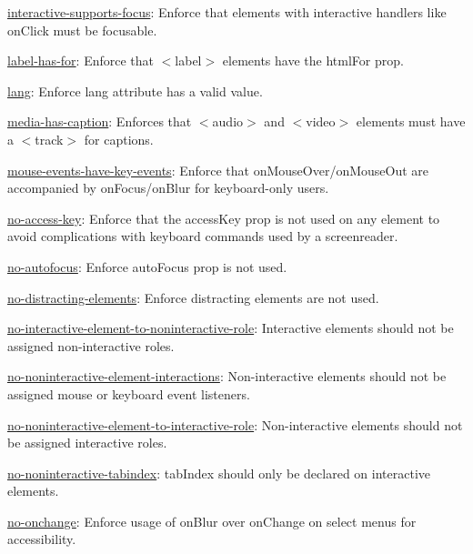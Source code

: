 \begin{DoxyItemize}
\item \mbox{\hyperlink{interactive-supports-focus_8md}{interactive-\/supports-\/focus}}\+: Enforce that elements with interactive handlers like {\ttfamily on\+Click} must be focusable.
\item \mbox{\hyperlink{label-has-for_8md}{label-\/has-\/for}}\+: Enforce that {\ttfamily $<$label$>$} elements have the {\ttfamily html\+For} prop.
\item \mbox{\hyperlink{lang_8md}{lang}}\+: Enforce lang attribute has a valid value.
\item \mbox{\hyperlink{media-has-caption_8md}{media-\/has-\/caption}}\+: Enforces that {\ttfamily $<$audio$>$} and {\ttfamily $<$video$>$} elements must have a {\ttfamily $<$track$>$} for captions.
\item \mbox{\hyperlink{mouse-events-have-key-events_8md}{mouse-\/events-\/have-\/key-\/events}}\+: Enforce that {\ttfamily on\+Mouse\+Over}/{\ttfamily on\+Mouse\+Out} are accompanied by {\ttfamily on\+Focus}/{\ttfamily on\+Blur} for keyboard-\/only users.
\item \mbox{\hyperlink{no-access-key_8md}{no-\/access-\/key}}\+: Enforce that the {\ttfamily access\+Key} prop is not used on any element to avoid complications with keyboard commands used by a screenreader.
\item \mbox{\hyperlink{no-autofocus_8md}{no-\/autofocus}}\+: Enforce auto\+Focus prop is not used.
\item \mbox{\hyperlink{no-distracting-elements_8md}{no-\/distracting-\/elements}}\+: Enforce distracting elements are not used.
\item \mbox{\hyperlink{no-interactive-element-to-noninteractive-role_8md}{no-\/interactive-\/element-\/to-\/noninteractive-\/role}}\+: Interactive elements should not be assigned non-\/interactive roles.
\item \mbox{\hyperlink{no-noninteractive-element-interactions_8md}{no-\/noninteractive-\/element-\/interactions}}\+: Non-\/interactive elements should not be assigned mouse or keyboard event listeners.
\item \mbox{\hyperlink{no-noninteractive-element-to-interactive-role_8md}{no-\/noninteractive-\/element-\/to-\/interactive-\/role}}\+: Non-\/interactive elements should not be assigned interactive roles.
\item \mbox{\hyperlink{no-noninteractive-tabindex_8md}{no-\/noninteractive-\/tabindex}}\+: {\ttfamily tab\+Index} should only be declared on interactive elements.
\item \mbox{\hyperlink{no-onchange_8md}{no-\/onchange}}\+: Enforce usage of {\ttfamily on\+Blur} over {\ttfamily on\+Change} on select menus for accessibility.

\end{DoxyItemize}
